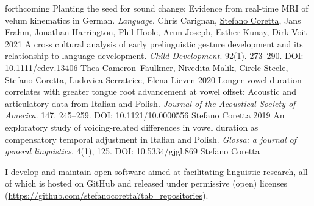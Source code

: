 \documentclass[9pt]{developercv} %
\begin{document}


\begin{entrylist}
	\entry
		{forthcoming}
		{Planting the seed for sound change: Evidence from real-time MRI of velum kinematics in German. \textnormal{\textit{Language}.} \vspace{0.5em}}
		{}
		{\small Chris Carignan, \underline{Stefano Coretta}, Jans Frahm, Jonathan Harrington, Phil Hoole, Arun Joseph, Esther Kunay, Dirk Voit}
	\entry
		{2021}
		{A cross cultural analysis of early prelinguistic gesture development and its relationship to language development. \textnormal{\textit{Child Development}. 92(1). 273--290. DOI: 10.1111/cdev.13406} \vspace{0.5em}}
		{}
		{\small Thea Cameron--Faulkner, Nivedita Malik, Circle Steele, \underline{Stefano Coretta}, Ludovica Serratrice, Elena Lieven}
	\entry
		{2020}
		{Longer vowel duration correlates with greater tongue root advancement at vowel offset: Acoustic and articulatory data from Italian and Polish. \textnormal{\textit{Journal of the Acoustical Society of America}. 147. 245--259. DOI: 10.1121/10.0000556} \vspace{0.5em}}
		{}
		{\small Stefano Coretta}
	\entry
		{2019}
		{An exploratory study of voicing‐related differences in vowel duration as compensatory temporal adjustment in Italian and Polish. \textnormal{\textit{Glossa: a journal of general linguistics}. 4(1), 125. DOI: 10.5334/gjgl.869} \vspace{0.5em}}
		{}
		{\small Stefano Coretta}
\end{entrylist}



\begin{entrylist}
	\entry
		{\hspace{1em}}
		{\textnormal{I develop and maintain open software aimed at facilitating linguistic research, all of which is hosted on GitHub and released under permissive (open) licenses (\url{https://github.com/stefanocoretta?tab=repositories}).}}
		{}
		{}
\end{entrylist}
\end{document}

